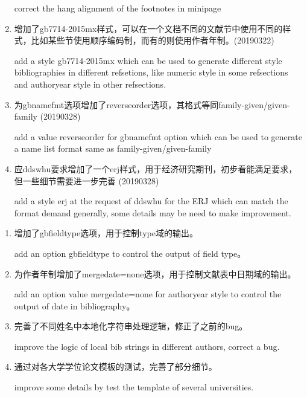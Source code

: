 \begin{enumerate}
correct the hang alignment of the footnotes in minipage

\item 增加了gb7714-2015mx样式，可以在一个文档不同的文献节中使用不同的样式，比如某些节使用顺序编码制，而有的则使用作者年制。(20190322)

add a style gb7714-2015mx which can be used to generate different style bibliographies in different refsetions, like numeric style in some refsections and authoryear style in other refsections.

\item 为gbnamefmt选项增加了reverseorder选项，其格式等同family-given/given-family (20190328)

add a value reverseorder for gbnamefmt option which can be used to generate a name list format same as family-given/given-family

\item 应ddswhu要求增加了一个erj样式，用于经济研究期刊，初步看能满足要求，但一些细节需要进一步完善 (20190328)

add a style erj at the request of ddswhu for the ERJ which can match the format demand generally, some details may be need to make improvement.
\end{enumerate}

\label{up:190211}
\begin{enumerate}

\item 增加了gbfieldtype选项，用于控制type域的输出。

add an option gbfieldtype to control the output of field type。

\item 为作者年制增加了mergedate=none选项，用于控制文献表中日期域的输出。

add an option value mergedate=none for authoryear style to control the output of date in bibliography。

\item 完善了不同姓名中本地化字符串处理逻辑，修正了之前的bug。

improve the logic of local bib strings in different authors, correct a bug.

\item 通过对各大学学位论文模板的测试，完善了部分细节。

improve some details by test the template of several universities.

\end{enumerate}

